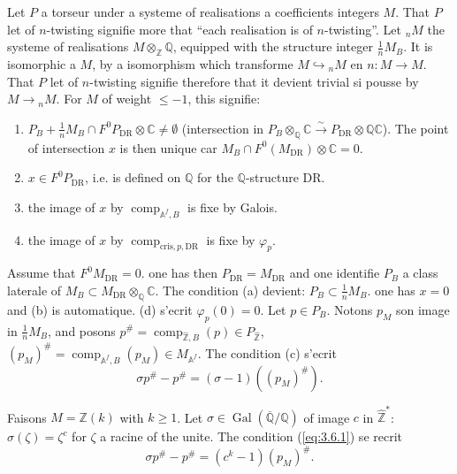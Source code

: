 \documentclass[12pt,a4paper]{article}
\theoremstyle{plain}
\theoremstyle{definition}
\theoremstyle{remark}
\DeclareMathOperator{\Gal}{Gal}
\providecommand{\Gal}{\operatorname{Gal}}
\providecommand{\DR}{\mathrm{DR}}
\providecommand{\cris}{\mathrm{cris}}
\providecommand{\comp}{\operatorname{comp}}
\begin{document}
\begin{paraphrase}[3.6]
Let $P$ a torseur under a systeme of realisations a coefficients integers $M$. That
$P$ let of $n$-twisting signifie more that ``each realisation is of $n$-twisting''. Let
${}_n M$ the systeme of realisations $M \otimes_{\mathbb{Z}} \mathbb{Q}$, equipped with the
structure integer $\frac{1}{n} M_B$. It is isomorphic a $M$, by a isomorphism which
transforme $M \hookrightarrow {}_n M$ en $n: M \to M$. That $P$ let of $n$-twisting
signifie therefore that it devient trivial si pousse by $M \to {}_n M$. For $M$ of weight
$\leq -1$, this signifie:
\begin{enumerate}[label=(\alph*)]
\item $P_B + \frac{1}{n} M_B \cap F^0 P_{\DR} \otimes \mathbb{C} \neq \emptyset$
(intersection in $P_B \otimes_{\mathbb{Q}} \mathbb{C} \xrightarrow{\sim} P_{\DR} \otimes
\mathbb{Q} \mathbb{C}$). The point of intersection $x$ is then unique car $M_B \cap
F^0(M_{\DR}) \otimes \mathbb{C} = 0$.
\item $x \in F^0 P_{\DR}$, i.e. is defined on $\mathbb{Q}$ for the
$\mathbb{Q}$-structure $\DR$.
\item the image of $x$ by $\comp_{\mathbb{A}^f,B}$ is fixe by Galois.
\item the image of $x$ by $\comp_{\cris,p,\DR}$ is fixe by $\varphi_p$.
\end{enumerate}

Assume that $F^0 M_{\DR} = 0$. one has then $P_{\DR} = M_{\DR}$ and one identifie $P_B$
a class laterale of $M_B \subset M_{\DR} \otimes_{\mathbb{Q}} \mathbb{C}$. The condition
(a) devient: $P_B \subset \frac{1}{n} M_B$. one has $x = 0$ and (b) is automatique. (d)
s'ecrit $\varphi_p(0) = 0$. Let $p \in P_B$. Notons $p_M$ son image in $\frac{1}{n} M_B$,
and posons $p^\# = \comp_{\hat{\mathbb{Z}},B}(p) \in P_{\hat{\mathbb{Z}}}$,
$(p_M)^\# = \comp_{\mathbb{A}^f,B}(p_M) \in M_{\mathbb{A}^f}$. The condition (c) s'ecrit
\begin{equation}\label{eq:3.6.1}
\sigma p^\# - p^\# = (\sigma - 1)((p_M)^\#).
\end{equation}

Faisons $M = \mathbb{Z}(k)$ with $k \geq 1$. Let $\sigma \in
\Gal(\overline{\mathbb{Q}}/\mathbb{Q})$ of image $c$ in $\hat{\mathbb{Z}}^*$:
$\sigma(\zeta) = \zeta^c$ for $\zeta$ a racine of the unite. The condition
(\ref{eq:3.6.1}) se recrit
\begin{equation}\label{eq:3.6.2}
\sigma p^\# - p^\# = (c^k - 1)(p_M)^\#.
\end{equation}


\end{paraphrase}
\end{document}
